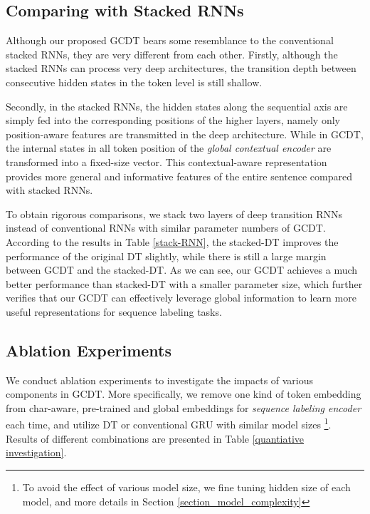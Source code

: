 \documentclass[11pt,a4paper]{article}
\begin{document}
\subsection{Comparing with Stacked RNNs}
Although our proposed GCDT bears some resemblance to the conventional stacked RNNs, they are very different from each other. Firstly, although the stacked RNNs can process very deep architectures, the transition depth between consecutive hidden states in the token level is still shallow.

Secondly, in the stacked RNNs, the hidden states along the sequential axis are simply fed into the corresponding positions of the higher layers, namely only position-aware features are transmitted in the deep architecture. While in GCDT, the internal states in all token position of the \emph{global contextual encoder} are transformed into a fixed-size vector.
This contextual-aware representation provides more general and informative features of the entire sentence compared with stacked RNNs.

To obtain rigorous comparisons, we stack two layers of deep transition RNNs instead of conventional RNNs with similar parameter numbers of GCDT. 
According to the results in Table \ref{stack-RNN},
the stacked-DT improves the performance of the original DT slightly, while there is still a large margin between GCDT and the stacked-DT. 
As we can see, our GCDT achieves a much better performance than stacked-DT with a smaller parameter size, which further verifies that our GCDT can effectively leverage global information to learn more useful representations for sequence labeling tasks. 

\begin{table}[t!]
\begin{center}
\end{center}
\caption{Comparison of CoNLL03 test $F_1$ between stacked RNNs and GCDT.}
\label{stack-RNN}
\end{table}

\subsection{Ablation Experiments} 
We conduct ablation experiments to investigate the impacts of various components in GCDT. More specifically, we remove one kind of token embedding from char-aware, pre-trained and global embeddings for \emph{sequence labeling encoder} each time, and utilize DT or conventional GRU with similar model sizes \footnote{To avoid the effect of various model size, we fine tuning hidden size of each model, and more details in Section \ref{section_model_complexity}}.
Results of different combinations are presented in Table \ref{quantiative investigation}.
\end{document}
